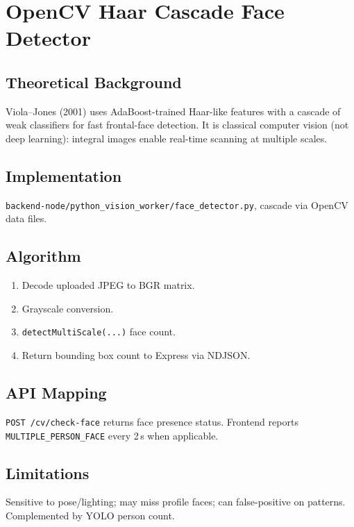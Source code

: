 \documentclass[11pt,a4paper]{report}
\begin{document}
\section{OpenCV Haar Cascade Face Detector}

\subsection{Theoretical Background}
Viola--Jones (2001) uses AdaBoost-trained Haar-like features with a cascade of weak classifiers for fast frontal-face detection. It is classical computer vision (not deep learning): integral images enable real-time scanning at multiple scales.

\subsection{Implementation}
\texttt{backend-node/python\_vision\_worker/face\_detector.py}, cascade via OpenCV data files.

\subsection{Algorithm}
\begin{enumerate}
  \item Decode uploaded JPEG to BGR matrix.
  \item Grayscale conversion.
  \item \texttt{detectMultiScale(...)} face count.
  \item Return bounding box count to Express via NDJSON.
\end{enumerate}

\subsection{API Mapping}
\texttt{POST /cv/check-face} returns face presence status. Frontend reports \texttt{MULTIPLE\_PERSON\_FACE} every 2\,s when applicable.

\subsection{Limitations}
Sensitive to pose/lighting; may miss profile faces; can false-positive on patterns. Complemented by YOLO person count.

\end{document}
